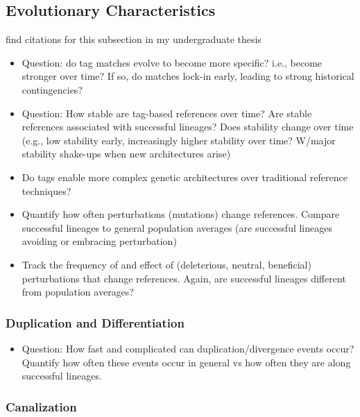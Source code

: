 \subsection{Evolutionary Characteristics}

find citations for this subsection in my undergraduate thesis

\begin{itemize}
  \item Question: do tag matches evolve to become more specific? i.e., become stronger over time?
        If so, do matches lock-in early, leading to strong historical contingencies?
  \item Question: How stable are tag-based references over time? Are stable references
        associated with successful lineages? Does stability change over time (e.g.,
        low stability early, increasingly higher stability over time? W/major stability
        shake-ups when new architectures arise)
  \item Do tags enable more complex genetic architectures over traditional reference
        techniques?
  \item Quantify how often perturbations (mutations) change references. Compare
        successful lineages to general population averages (are successful lineages
        avoiding or embracing perturbation)
  \item Track the frequency of and effect of (deleterious, neutral, beneficial)
        perturbations that change references. Again, are successful lineages different
        from population averages?
\end{itemize}

\subsubsection{Duplication and Differentiation}

\begin{itemize}
  \item Question: How fast and complicated can duplication/divergence events occur?
        Quantify how often these events occur in general vs how often they are along
        successful lineages.
\end{itemize}

\subsubsection{Canalization}

